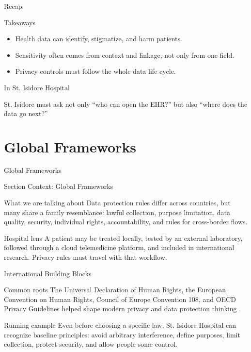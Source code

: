 \documentclass[presentation]{beamer}
\newcommand{\sectiontitleframe}[1]{
\begin{frame}[plain,c]
\begin{center}
{\usebeamerfont{title}\usebeamercolor[fg]{title}#1}
\end{center}
\end{frame}
}
\newcommand{\scenario}{St. Isidore Hospital}
\newcommand{\takeawaysframe}[2]{
\begin{frame}[c]{Recap: \insertsection}
\begin{block}{Takeaways}
#1
\end{block}
\begin{exampleblock}{In \scenario}
#2
\end{exampleblock}
\end{frame}
}
\begin{document}
\takeawaysframe{
\begin{itemize}
    \item Health data can identify, stigmatize, and harm patients.
    \item Sensitivity often comes from context and linkage, not only from one field.
    \item Privacy controls must follow the whole data life cycle.
\end{itemize}
}{
St. Isidore must ask not only ``who can open the EHR?'' but also ``where does the data go next?''
}

\section{Global Frameworks}
\sectiontitleframe{Global Frameworks}

\begin{frame}[c]{Section Context: Global Frameworks}
\begin{block}{What we are talking about}
Data protection rules differ across countries, but many share a family resemblance: lawful
collection, purpose limitation, data quality, security, individual rights, accountability, and rules
for cross-border flows.
\end{block}

\begin{exampleblock}{Hospital lens}
A patient may be treated locally, tested by an external laboratory, followed through a cloud
telemedicine platform, and included in international research. Privacy rules must travel with that
workflow.
\end{exampleblock}
\end{frame}

\begin{frame}[c]{International Building Blocks}
\begin{block}{Common roots}
The Universal Declaration of Human Rights, the European Convention on Human Rights, Council of
Europe Convention 108, and OECD Privacy Guidelines helped shape modern privacy and data protection
thinking \cite{udhr,echr,coe108,oecd_privacy}.
\end{block}

\begin{exampleblock}{Running example}
Even before choosing a specific law, \scenario{} can recognize baseline principles: avoid arbitrary
interference, define purposes, limit collection, protect security, and allow people some control.
\end{exampleblock}
\end{frame}
\end{document}
